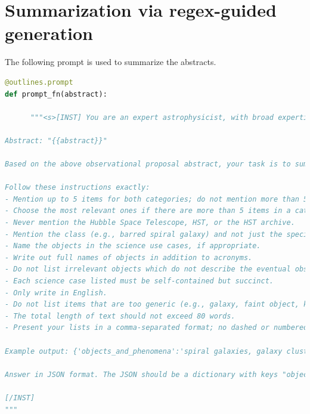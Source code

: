 \documentclass[10pt]{article} %
\begin{document}



\appendix
\section{Summarization via regex-guided generation}
\label{app:summarization}

The following prompt is used to summarize the abstracts.

\begin{lstlisting}[language=Python]
@outlines.prompt
def prompt_fn(abstract):
            
      """<s>[INST] You are an expert astrophysicist, with broad expertise across observational and theoretical astrophysics. You are able to extract core information from astrophysical texts.

Abstract: "{{abstract}}"

Based on the above observational proposal abstract, your task is to summarize the nature of the eventual observations. You will identify the astrophysical objects and phenomena, as well as the potential science use cases described in the abstract.

Follow these instructions exactly:
- Mention up to 5 items for both categories; do not mention more than 5 items in either category. 
- Choose the most relevant ones if there are more than 5 items in a category.
- Never mention the Hubble Space Telescope, HST, or the HST archive.
- Mention the class (e.g., barred spiral galaxy) and not just the specific instance (e.g., Andromeda).
- Name the objects in the science use cases, if appropriate.
- Write out full names of objects in addition to acronyms.
- Do not list irrelevant objects which do not describe the eventual observation, such as units or proposal Cycle numbers. List fewer but more relevant objects, if in doubt.
- Each science case listed must be self-contained but succinct.
- Only write in English.
- Do not list items that are too generic (e.g., galaxy, faint object, kinematics)
- The total length of text should not exceed 80 words.
- Present your lists in a comma-separated format; no dashed or numbered lists.

Example output: {'objects_and_phenomena':'spiral galaxies, galaxy clusters, supernova remnants', 'science_use_cases':'model galactic structure and evolution, characterize dark matter distribution in clusters, analyze expansion rates of supernova remnants'}

Answer in JSON format. The JSON should be a dictionary with keys "objects_and_phenomena" and "science_use_cases".

[/INST]
"""
\end{lstlisting}
\end{document}
